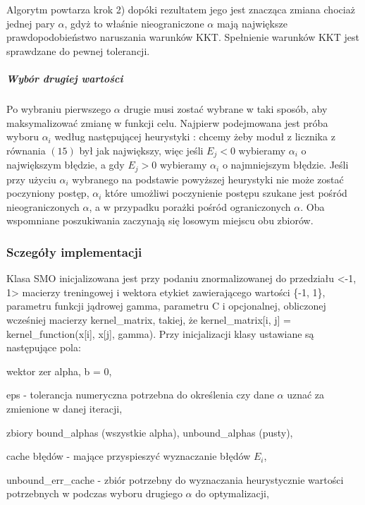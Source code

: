 \documentclass[11pt]{article}
\begin{document}
Algorytm powtarza krok 2) dopóki rezultatem jego jest znacząca zmiana
chociaż jednej pary \(\alpha\), gdyż to właśnie nieograniczone
\(\alpha\) mają największe prawdopodobieństwo naruszania warunków KKT.
Spełnienie warunków KKT jest sprawdzane do pewnej tolerancji.

\hypertarget{wybuxf3r-drugiej-wartoux15bci}{%
\subparagraph{Wybór drugiej
wartości}\label{wybuxf3r-drugiej-wartoux15bci}}

Po wybraniu pierwszego \(\alpha\) drugie musi zostać wybrane w taki
sposób, aby maksymalizować zmianę w funkcji celu. Najpierw podejmowana
jest próba wyboru \(\alpha_i\) według następującej heurystyki : chcemy
żeby moduł z licznika z równania \((15)\) był jak największy, więc jeśli
\(E_j < 0\) wybieramy \(\alpha_i\) o największym błędzie, a gdy
\(E_j > 0\) wybieramy \(\alpha_i\) o najmniejszym błędzie. Jeśli przy
użyciu \(\alpha_i\) wybranego na podstawie powyższej heurystyki nie może
zostać poczyniony postęp, \(\alpha_i\) które umożliwi poczynienie
postępu szukane jest pośród nieograniczonych \(\alpha\), a w przypadku
porażki pośród ograniczonych \(\alpha\). Oba wspomniane poszukiwania
zaczynają się losowym miejscu obu zbiorów.

    \hypertarget{sczeguxf3ux142y-implementacji}{%
\subsubsection{Sczegóły
implementacji}\label{sczeguxf3ux142y-implementacji}}

Klasa SMO inicjalizowana jest przy podaniu znormalizowanej do przedziału
\textless-1, 1\textgreater{} macierzy treningowej i wektora etykiet
zawierającego wartości \{-1, 1\}, parametru funkcji jądrowej gamma,
parametru C i opcjonalnej, obliczonej wcześniej macierzy kernel\_matrix,
takiej, że kernel\_matrix{[}i, j{]} = kernel\_function(x{[}i{]},
x{[}j{]}, gamma). Przy inicjalizacji klasy ustawiane są następujące
pola:

wektor zer alpha, b = 0,

eps - tolerancja numeryczna potrzebna do określenia czy dane \(\alpha\)
uznać za zmienione w danej iteracji,

zbiory bound\_alphas (wszystkie alpha), unbound\_alphas (pusty),

cache błędów - mające przyspieszyć wyznaczanie błędów \(E_i\),

unbound\_err\_cache - zbiór potrzebny do wyznaczania heurystycznie
wartości potrzebnych w podczas wyboru drugiego \(\alpha\) do
optymalizacji,
\end{document}
